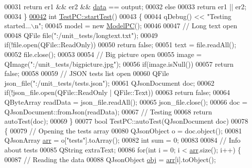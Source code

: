 \begin{DoxyCode}
00031         \textcolor{keywordflow}{return} er1 && er2 && \mbox{\hyperlink{namespace_errors_dict_setup_af570460846fb9f0c91abd308a095dcdc}{data}} == output;
00032     \textcolor{keywordflow}{else}
00033         \textcolor{keywordflow}{return} er1 || er2;
00034 \}
\mbox{\hyperlink{class_test_p_c_ad0d724439a65d183d3d336b667cb867b}{00042}} \textcolor{keywordtype}{int} \mbox{\hyperlink{class_test_p_c_ad0d724439a65d183d3d336b667cb867b}{TestPC::startTest}}()
00043 \{
00044     qDebug() << \textcolor{stringliteral}{"Testing started...\(\backslash\)n"};
00045     model = \textcolor{keyword}{new} \mbox{\hyperlink{class_model_p_c}{ModelPC}}();
00046 
00047     \textcolor{comment}{// Long text open}
00048     QFile file(\textcolor{stringliteral}{":/unit\_tests/longtext.txt"});
00049     \textcolor{keywordflow}{if}(!file.open(QFile::ReadOnly))
00050         \textcolor{keywordflow}{return} \textcolor{keyword}{false};
00051     text = file.readAll();
00052     file.close();
00053 
00054     \textcolor{comment}{// Big picture open}
00055     image = QImage(\textcolor{stringliteral}{":/unit\_tests/bigpicture.jpg"});
00056     \textcolor{keywordflow}{if}(image.isNull())
00057         \textcolor{keywordflow}{return} \textcolor{keyword}{false};
00058 
00059     \textcolor{comment}{// JSON tests list open}
00060     QFile json\_file(\textcolor{stringliteral}{":/unit\_tests/tests.json"});
00061     QJsonDocument doc;
00062     \textcolor{keywordflow}{if}(!json\_file.open(QFile::ReadOnly | QFile::Text))
00063         \textcolor{keywordflow}{return} \textcolor{keyword}{false};
00064     QByteArray readData = json\_file.readAll();
00065     json\_file.close();
00066     doc = QJsonDocument::fromJson(readData);
00067     \textcolor{comment}{// Testing}
00068     \textcolor{keywordflow}{return} autoTest(doc);
00069 \}
00077 \textcolor{keywordtype}{bool} TestPC::autoTest(QJsonDocument doc)
00078 \{
00079     \textcolor{comment}{// Opening the tests array}
00080     QJsonObject o = doc.object();
00081     QJsonArray \mbox{\hyperlink{namespacetests-setup_a274aaa7c0d5733ef5f48372d9481f34a}{arr}} = o[\textcolor{stringliteral}{"tests"}].toArray();
00082     \textcolor{keywordtype}{int} sum = 0;
00083 
00084     \textcolor{comment}{// Info about tests}
00085     QString extraText;
00086     \textcolor{keywordflow}{for}(\textcolor{keywordtype}{int} i = 0; i < \mbox{\hyperlink{namespacetests-setup_a274aaa7c0d5733ef5f48372d9481f34a}{arr}}.size(); i++) \{
00087         \textcolor{comment}{// Reading the data}
00088         QJsonObject \mbox{\hyperlink{namespacetests-setup_afb80c1236926b5468a6d3e942a527a96}{obj}} = \mbox{\hyperlink{namespacetests-setup_a274aaa7c0d5733ef5f48372d9481f34a}{arr}}[i].toObject();

\end{DoxyCode}
